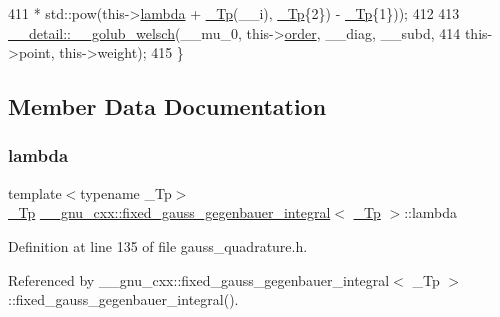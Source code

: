 \begin{DoxyCode}
411                           * std::pow(this->\hyperlink{struct____gnu__cxx_1_1fixed__gauss__gegenbauer__integral_a920e1b46f20a45756e3cd563ab7fd1e3}{lambda} + \hyperlink{namespace____gnu__cxx_a3b19a9c800ca194374ef9172290f7d79}{\_Tp}(\_\_i), \hyperlink{namespace____gnu__cxx_a3b19a9c800ca194374ef9172290f7d79}{\_Tp}\{2\}) - 
      \hyperlink{namespace____gnu__cxx_a3b19a9c800ca194374ef9172290f7d79}{\_Tp}\{1\}));
412 
413       \hyperlink{namespace____gnu__cxx_1_1____detail_aa9f299bb7c04606a9a9aab3ab9e4f4c8}{\_\_detail::\_\_golub\_welsch}(\_\_mu\_0, this->\hyperlink{struct____gnu__cxx_1_1fixed__gauss__gegenbauer__integral_ae0cf76d27bf84a9664b8fa94ad1037ea}{order}, \_\_diag, \_\_subd,
414                                this->point, this->weight);
415     \}
\end{DoxyCode}


\subsection{Member Data Documentation}
\mbox{\label{struct____gnu__cxx_1_1fixed__gauss__gegenbauer__integral_a920e1b46f20a45756e3cd563ab7fd1e3}} 
\subsubsection{\texorpdfstring{lambda}{lambda}}
{\footnotesize\ttfamily template$<$typename \+\_\+\+Tp$>$ \\
\hyperlink{namespace____gnu__cxx_a3b19a9c800ca194374ef9172290f7d79}{\+\_\+\+Tp} \hyperlink{struct____gnu__cxx_1_1fixed__gauss__gegenbauer__integral}{\+\_\+\+\_\+gnu\+\_\+cxx\+::fixed\+\_\+gauss\+\_\+gegenbauer\+\_\+integral}$<$ \hyperlink{namespace____gnu__cxx_a3b19a9c800ca194374ef9172290f7d79}{\+\_\+\+Tp} $>$\+::lambda}



Definition at line 135 of file gauss\+\_\+quadrature.\+h.



Referenced by \+\_\+\+\_\+gnu\+\_\+cxx\+::fixed\+\_\+gauss\+\_\+gegenbauer\+\_\+integral$<$ \+\_\+\+Tp $>$\+::fixed\+\_\+gauss\+\_\+gegenbauer\+\_\+integral().

